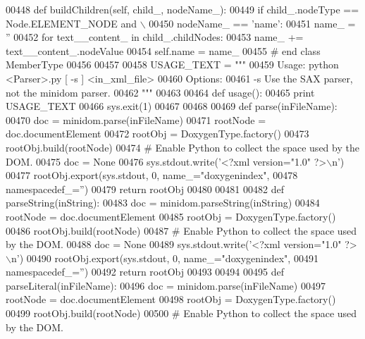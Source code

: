 \begin{DoxyCode}
{{{{{{{{{{{{{{{{{{{{{{{{{{{{{{{{{{{{{{{{00448     \textcolor{keyword}{def }buildChildren(self, child\_, nodeName\_):
00449         \textcolor{keywordflow}{if} child\_.nodeType == Node.ELEMENT\_NODE \textcolor{keywordflow}{and} \(\backslash\)
00450             nodeName\_ == \textcolor{stringliteral}{'name'}:
00451             name\_ = \textcolor{stringliteral}{''}
00452             \textcolor{keywordflow}{for} text\_\_content\_ \textcolor{keywordflow}{in} child\_.childNodes:
00453                 name\_ += text\_\_content\_.nodeValue
00454             self.name = name\_
00455 \textcolor{comment}{# end class MemberType}
00456 
00457 
00458 USAGE\_TEXT = \textcolor{stringliteral}{"""}
00459 \textcolor{stringliteral}{Usage: python <Parser>.py [ -s ] <in\_xml\_file>}
00460 \textcolor{stringliteral}{Options:}
00461 \textcolor{stringliteral}{    -s        Use the SAX parser, not the minidom parser.}
00462 \textcolor{stringliteral}{"""}
00463 
00464 \textcolor{keyword}{def }usage():
00465     \textcolor{keywordflow}{print} USAGE\_TEXT
00466     sys.exit(1)
00467 
00468 
00469 \textcolor{keyword}{def }parse(inFileName):
00470     doc = minidom.parse(inFileName)
00471     rootNode = doc.documentElement
00472     rootObj = DoxygenType.factory()
00473     rootObj.build(rootNode)
00474     \textcolor{comment}{# Enable Python to collect the space used by the DOM.}
00475     doc = \textcolor{keywordtype}{None}
00476     sys.stdout.write(\textcolor{stringliteral}{'<?xml version="1.0" ?>\(\backslash\)n'})
00477     rootObj.export(sys.stdout, 0, name\_=\textcolor{stringliteral}{"doxygenindex"},
00478         namespacedef\_=\textcolor{stringliteral}{''})
00479     \textcolor{keywordflow}{return} rootObj
00480 
00481 
00482 \textcolor{keyword}{def }parseString(inString):
00483     doc = minidom.parseString(inString)
00484     rootNode = doc.documentElement
00485     rootObj = DoxygenType.factory()
00486     rootObj.build(rootNode)
00487     \textcolor{comment}{# Enable Python to collect the space used by the DOM.}
00488     doc = \textcolor{keywordtype}{None}
00489     sys.stdout.write(\textcolor{stringliteral}{'<?xml version="1.0" ?>\(\backslash\)n'})
00490     rootObj.export(sys.stdout, 0, name\_=\textcolor{stringliteral}{"doxygenindex"},
00491         namespacedef\_=\textcolor{stringliteral}{''})
00492     \textcolor{keywordflow}{return} rootObj
00493 
00494 
00495 \textcolor{keyword}{def }parseLiteral(inFileName):
00496     doc = minidom.parse(inFileName)
00497     rootNode = doc.documentElement
00498     rootObj = DoxygenType.factory()
00499     rootObj.build(rootNode)
00500     \textcolor{comment}{# Enable Python to collect the space used by the DOM.}
}}}}}}}}}}}}}}}}}}}}}}}}}}}}}}}}}}}}}}}}
\end{DoxyCode}
